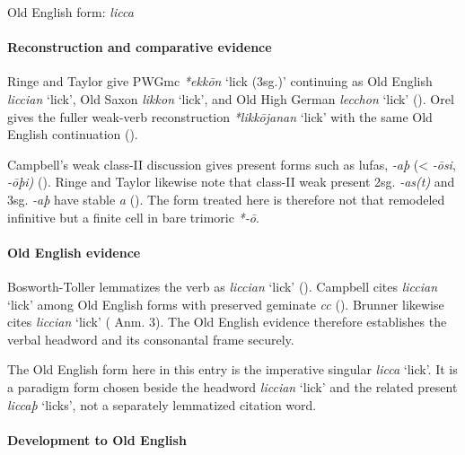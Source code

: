 \documentclass[
  british,
  a4paper,
]{article}
\providecommand{\Recon}[1]{\emph{*#1}}
\begin{document}
Old English form: \emph{licca}

\paragraph{Reconstruction and comparative
evidence}\label{reconstruction-and-comparative-evidence-134}

Ringe and Taylor give PWGmc \Recon{ekkōn} `lick (3sg.)' continuing as
Old English {\emph{liccian}} `lick', Old Saxon {\emph{likkon}} `lick',
and Old High German {\emph{lecchon}} `lick'
(). Orel gives
the fuller weak-verb reconstruction \Recon{likkōjanan} `lick' with the
same Old English continuation ().

Campbell's weak class-II discussion gives present forms such as lufas,
\emph{-aþ} (\textless{} \emph{-ōsi}, \emph{-ōþi)}
(). Ringe and
Taylor likewise note that class-II weak present 2sg. \emph{-as(t)} and
3sg. \emph{-aþ} have stable \emph{a}
(). The form
treated here is therefore not that remodeled infinitive but a finite
cell in bare trimoric \emph{*-ō}.

\paragraph{Old English evidence}\label{old-english-evidence-136}

Bosworth-Toller lemmatizes the verb as \emph{liccian} `lick'
().
Campbell cites \emph{liccian} `lick' among Old English forms with
preserved geminate \emph{cc} (). Brunner likewise cites \emph{liccian} `lick'
( Anm. 3). The
Old English evidence therefore establishes the verbal headword and its
consonantal frame securely.

The Old English form here in this entry is the imperative singular
{\emph{licca}} `lick'. It is a paradigm form chosen beside the headword
{\emph{liccian}} `lick' and the related present {\emph{liccaþ}} `licks',
not a separately lemmatized citation word.

\paragraph{Development to Old
English}\label{development-to-old-english-134}
\end{document}
